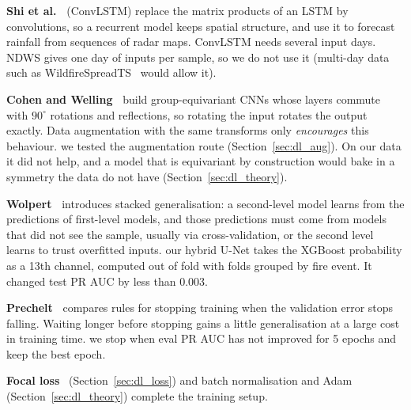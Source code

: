 \textbf{Shi et al.~\cite{shi2015}} (ConvLSTM) replace the matrix products of an LSTM by convolutions, so a
recurrent model keeps spatial structure, and use it to forecast rainfall from sequences of radar maps.
\relevance{} ConvLSTM needs several input days. NDWS gives one day of inputs per sample, so we do not use
it (multi-day data such as WildfireSpreadTS~\cite{gerard2023} would allow it).

\textbf{Cohen and Welling~\cite{cohen2016}} build group-equivariant CNNs whose layers commute with
$90^\circ$ rotations and reflections, so rotating the input rotates the output exactly. Data augmentation
with the same transforms only \emph{encourages} this behaviour. \relevance{} we tested the augmentation
route (Section~\ref{sec:dl_aug}). On our data it did not help, and a model that is equivariant by
construction would bake in a symmetry the data do not have (Section~\ref{sec:dl_theory}).

\textbf{Wolpert~\cite{wolpert1992}} introduces stacked generalisation: a second-level model learns from
the predictions of first-level models, and those predictions must come from models that did not see the
sample, usually via cross-validation, or the second level learns to trust overfitted inputs.
\relevance{} our hybrid U-Net takes the XGBoost probability as a 13th channel, computed out of fold with
folds grouped by fire event. It changed test PR AUC by less than 0.003.

\textbf{Prechelt~\cite{prechelt1998}} compares rules for stopping training when the validation error
stops falling. Waiting longer before stopping gains a little generalisation at a large cost in training
time. \relevance{} we stop when eval PR AUC has not improved for 5 epochs and keep the best epoch.

\textbf{Focal loss}~\cite{lin2017} (Section~\ref{sec:dl_loss}) and batch normalisation and
Adam~\cite{ioffe2015,kingma2015} (Section~\ref{sec:dl_theory}) complete the training setup.


